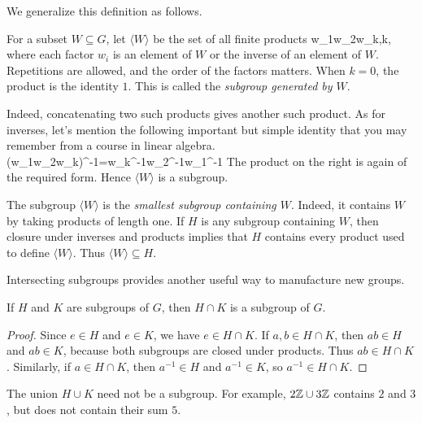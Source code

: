 \documentclass[reqno,11pt]{amsart}
\begin{document}
 We generalize this definition as follows.

 \begin{define}
		 For a subset $W\subseteq G$, let $\langle W\rangle$ be the set of all
		 finite products
		 \be
		 w_1w_2\cdots w_k,\qquad k,
		 \ee
		 where each factor $w_i$ is an element of $W$ or the inverse of an element
		 of $W$. Repetitions are allowed, and the order of the factors matters.
		 When $k=0$, the product is the identity $1$. This is called the
		 \emph{subgroup generated by $W$}.
	 \end{define}

 Indeed, concatenating two such products gives another such product. As for inverses, let's mention the following important but simple identity that you may remember from a course in linear algebra.
 \be
 (w_1w_2\cdots w_k)^{-1}=w_k^{-1}\cdots w_2^{-1}w_1^{-1}
 \ee
 The product on the right is again of the required form. Hence
 $\langle W\rangle$ is a subgroup.

 \begin{remark}
		 The subgroup $\langle W\rangle$ is the \emph{smallest subgroup containing
				 $W$}. Indeed, it contains $W$ by taking products of length one. If $H$ is
		 any subgroup containing $W$, then closure under inverses and products
		 implies that $H$ contains every product used to define $\langle W\rangle$.
		 Thus $\langle W\rangle\subseteq H$.
		 \end{remark}



 Intersecting subgroups provides another useful way to manufacture new groups.


 \begin{proposition}
		 If $H$ and $K$ are subgroups of $G$, then $H\cap K$ is a subgroup of $G$.
		 \end{proposition}

 \begin{proof}
		 Since $e\in H$ and $e\in K$, we have $e\in H\cap K$.
		 If $a,b\in H\cap K$, then $ab\in H$ and $ab\in K$, because both
		 subgroups are closed under products. Thus $ab\in H\cap K$.
		 Similarly, if $a\in H\cap K$, then $a^{-1}\in H$ and $a^{-1}\in K$,
		 so $a^{-1}\in H\cap K$.
		 \end{proof}

 \begin{remark}
		 The union $H\cup K$ need not be a subgroup. For example,
		 $2\mathbb{Z}\cup3\mathbb{Z}$ contains $2$ and $3$, but does not contain their sum $5$.
		 \end{remark}
\end{document}
